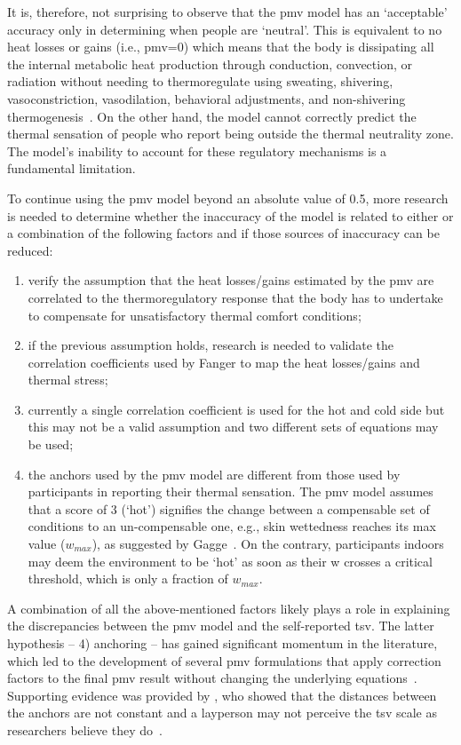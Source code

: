 It is, therefore, not surprising to observe that the \ac{pmv} model has an `acceptable' accuracy only in determining when people are `neutral'.
This is equivalent to no heat losses or gains (i.e., \ac{pmv}=0) which means that the body is dissipating all the internal metabolic heat production through conduction, convection, or radiation without needing to thermoregulate using sweating, shivering, vasoconstriction, vasodilation, behavioral adjustments, and non-shivering thermogenesis~\cite{ romanovsky_thermoregulation_2018}.
On the other hand, the model cannot correctly predict the thermal sensation of people who report being outside the thermal neutrality zone.
The model's inability to account for these regulatory mechanisms is a fundamental limitation.

To continue using the \ac{pmv} model beyond an absolute value of \num{0.5}, more research is needed to determine whether the inaccuracy of the model is related to either or a combination of the following factors and if those sources of inaccuracy can be reduced:
\begin{enumerate}
    \item verify the assumption that the heat losses/gains estimated by the \ac{pmv} are correlated to the thermoregulatory response that the body has to undertake to compensate for unsatisfactory thermal comfort conditions;
    \item if the previous assumption holds, research is needed to validate the correlation coefficients used by Fanger to map the heat losses/gains and thermal stress;
    \item currently a single correlation coefficient is used for the hot and cold side but this may not be a valid assumption and two different sets of equations may be used;
    \item the anchors used by the \ac{pmv} model are different from those used by participants in reporting their thermal sensation.
    The \ac{pmv} model assumes that a score of 3 (`hot') signifies the change between a compensable set of conditions to an un-compensable one, e.g., skin wettedness reaches its max value ($w_{max}$), as suggested by Gagge~\cite{GaggeSET}.
    On the contrary, participants indoors may deem the environment to be `hot' as soon as their \ac{w} crosses a critical threshold, which is only a fraction of $w_{max}$.
\end{enumerate}

A combination of all the above-mentioned factors likely plays a role in explaining the discrepancies between the \ac{pmv} model and the self-reported \ac{tsv}.
The latter hypothesis -- 4) anchoring -- has gained significant momentum in the literature, which led to the development of several \ac{pmv} formulations that apply correction factors to the final \ac{pmv} result without changing the underlying equations~\cite{Yao2022, Toftum2002}.
Supporting evidence was provided by , who showed that the distances between the anchors are not constant and a layperson may not perceive the \ac{tsv} scale as researchers believe they do~\cite{schweiker2019scales, schweiker2020evaluating}.


